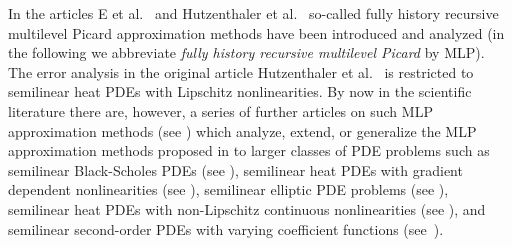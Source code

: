\documentclass[12pt]{article}
\theoremstyle{definition}
\begin{document}
In the articles 
E et al.~\cite{E2016multilevel}
and 
Hutzenthaler et al.~\cite{Hutzenthaleretal2018arXiv}
so-called
fully history recursive multilevel Picard approximation methods 
have been introduced and analyzed (in the following we abbreviate 
\emph{fully history recursive multilevel Picard} by MLP). 
The error analysis in the original article 
Hutzenthaler et al.~\cite{Hutzenthaleretal2018arXiv}
is restricted to semilinear heat PDEs with Lipschitz nonlinearities. 
By now in the scientific literature there are, however, a series of 
further articles on such MLP approximation methods 
(see \cite{hutzenthaler2019arxiv1903,Becketal2019MLP_nonlip_arXiv,giles2019generalised,beck2020arxiv2003,becker2020arxiv2005,hutzenthaler2019arxiv1912,hutzenthaler2020multilevel,
E2019multilevel,hutzenthaler2020lipschitz}) 
which analyze, extend, or generalize the 
MLP approximation methods proposed in \cite{E2016multilevel,Hutzenthaleretal2018arXiv} 
to larger classes of PDE problems such as 
semilinear Black-Scholes PDEs (see \cite{hutzenthaler2019arxiv1903,becker2020arxiv2005}), 
semilinear heat PDEs with gradient dependent nonlinearities (see \cite{hutzenthaler2019arxiv1912,hutzenthaler2020multilevel}), 
semilinear elliptic PDE problems (see \cite{beck2020arxiv2003}), 
semilinear heat PDEs with non-Lipschitz continuous nonlinearities (see \cite{Becketal2019MLP_nonlip_arXiv,becker2020arxiv2005}), 
and 
semilinear second-order PDEs with varying coefficient functions (see~\cite{hutzenthaler2019arxiv1903,hutzenthaler2020lipschitz}). 
\end{document}
